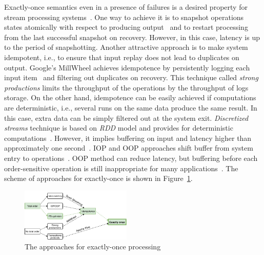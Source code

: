 \label {fs-short-intro}


Exactly-once semantics even in a presence of failures is a desired property for stream processing systems~\cite{Akidau:2013:MFS:2536222.2536229}. One way to achieve it is to snapshot operations states atomically with respect to producing output~\cite{Carbone:2017:SMA:3137765.3137777} and to restart processing from the last successful snapshot on recovery. However, in this case, latency is up to the period of snapshotting. Another attractive approach is to make system idempotent, i.e., to ensure that input replay does not lead to duplicates on output. Google's MillWheel achieves idempotence by persistently logging each input item~\cite{Akidau:2013:MFS:2536222.2536229} and filtering out duplicates on recovery. This technique called {\em strong productions} limits the throughput of the operations by the throughput of logs storage. On the other hand, idempotence can be easily achieved if computations are deterministic, i.e., several runs on the same data produce the same result. In this case, extra data can be simply filtered out at the system exit. {\em Discretized streams} technique is based on {\em RDD} model and provides for deterministic computations~\cite{Zaharia:2012:DSE:2342763.2342773}. However, it implies buffering on input and latency higher than approximately one second~\cite{Qian:2013:TRS:2465351.2465353}. IOP and OOP approaches shift buffer from system entry to operations~\cite{Li:2008:OPN:1453856.1453890}. OOP method can reduce latency, but buffering before each order-sensitive operation is still inappropriate for many applications~\cite{Zacheilas:2017:MDS:3093742.3093921}. The scheme of approaches for exactly-once is shown in Figure~\ref{approaches}.

\begin{figure}[ht]
  \centering
  \includegraphics[width=0.47\textwidth]{pics/intro-approaches}
  \caption{The approaches for exactly-once processing}
  \label {approaches}
\end{figure}

